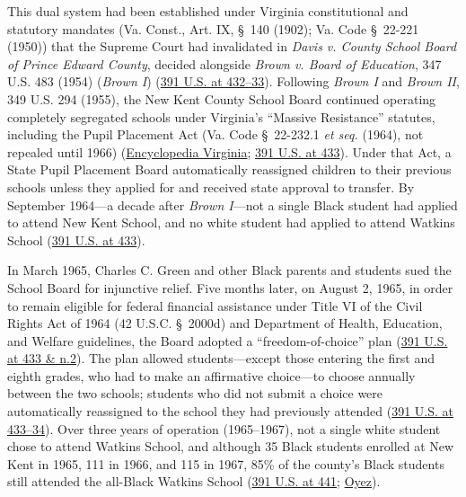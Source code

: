 \documentclass[12pt]{article}
\begin{document}
This dual system had been established under Virginia constitutional and statutory mandates (Va. Const., Art. IX, \S~140 (1902); Va. Code \S~22-221 (1950)) that the Supreme Court had invalidated in \textit{Davis v. County School Board of Prince Edward County}, decided alongside \textit{Brown v. Board of Education}, 347 U.S. 483 (1954) (\textit{Brown I}) (\href{https://supreme.justia.com/cases/federal/us/391/430/}{391 U.S. at 432--33}). Following \textit{Brown I} and \textit{Brown II}, 349 U.S. 294 (1955), the New Kent County School Board continued operating completely segregated schools under Virginia's ``Massive Resistance'' statutes, including the Pupil Placement Act (Va. Code \S~22-232.1 \textit{et seq.} (1964), not repealed until 1966) (\href{https://encyclopediavirginia.org/entries/green-charles-c-et-al-v-county-school-board-of-new-kent-county-virginia/}{Encyclopedia Virginia}; \href{https://supreme.justia.com/cases/federal/us/391/430/}{391 U.S. at 433}). Under that Act, a State Pupil Placement Board automatically reassigned children to their previous schools unless they applied for and received state approval to transfer. By September 1964---a decade after \textit{Brown I}---not a single Black student had applied to attend New Kent School, and no white student had applied to attend Watkins School (\href{https://supreme.justia.com/cases/federal/us/391/430/}{391 U.S. at 433}).

In March 1965, Charles C. Green and other Black parents and students sued the School Board for injunctive relief. Five months later, on August 2, 1965, in order to remain eligible for federal financial assistance under Title VI of the Civil Rights Act of 1964 (42 U.S.C. \S~2000d) and Department of Health, Education, and Welfare guidelines, the Board adopted a ``freedom-of-choice'' plan (\href{https://supreme.justia.com/cases/federal/us/391/430/}{391 U.S. at 433 \& n.2}). The plan allowed students---except those entering the first and eighth grades, who had to make an affirmative choice---to choose annually between the two schools; students who did not submit a choice were automatically reassigned to the school they had previously attended (\href{https://supreme.justia.com/cases/federal/us/391/430/}{391 U.S. at 433--34}). Over three years of operation (1965--1967), not a single white student chose to attend Watkins School, and although 35 Black students enrolled at New Kent in 1965, 111 in 1966, and 115 in 1967, 85\% of the county's Black students still attended the all-Black Watkins School (\href{https://supreme.justia.com/cases/federal/us/391/430/}{391 U.S. at 441}; \href{https://www.oyez.org/cases/1967/695}{Oyez}).
\end{document}
